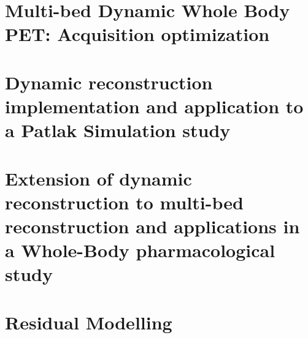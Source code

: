
\chapter{Multi-bed Dynamic Whole Body PET: Acquisition optimization}
\label{Chap3_1:AcquisitionOptimization}


\chapter{Dynamic reconstruction implementation and application to a Patlak Simulation study}
\label{Chap3_2:SimStudy}


\chapter{Extension of dynamic reconstruction to multi-bed reconstruction and applications in a Whole-Body pharmacological study}
\label{Chap3_3:IsotoPK}


\chapter{Residual Modelling}
\label{Chap3_4:Residual}
